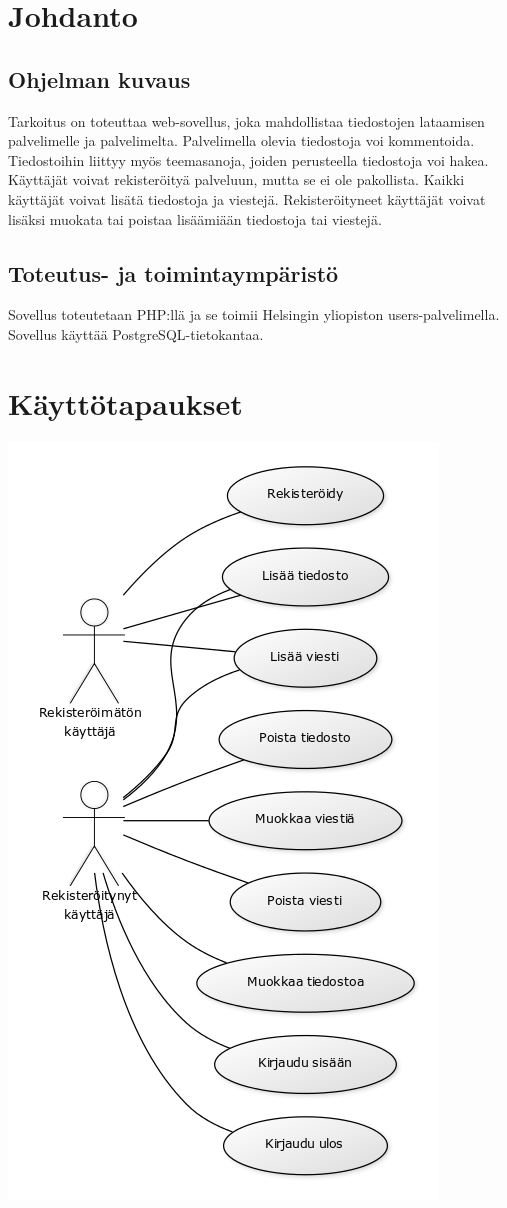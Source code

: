 \documentclass[10pt,a4paper]{article}
\begin{document}
\section{Johdanto}
\subsection{Ohjelman kuvaus}
Tarkoitus on toteuttaa web-sovellus, joka mahdollistaa tiedostojen lataamisen palvelimelle ja palvelimelta. Palvelimella olevia tiedostoja voi kommentoida. Tiedostoihin liittyy myös teemasanoja, joiden perusteella tiedostoja voi hakea. Käyttäjät voivat rekisteröityä palveluun, mutta se ei ole pakollista. Kaikki käyttäjät voivat lisätä tiedostoja ja viestejä. Rekisteröityneet käyttäjät voivat lisäksi muokata tai poistaa lisäämiään tiedostoja tai viestejä.

\subsection{Toteutus- ja toimintaympäristö}
Sovellus toteutetaan PHP:llä ja se toimii Helsingin yliopiston users-palvelimella. Sovellus käyttää PostgreSQL-tietokantaa.

\section{Käyttötapaukset}
\includegraphics[scale=0.7]{kaaviot/kayttotapauskaavio.png}
\end{document}

